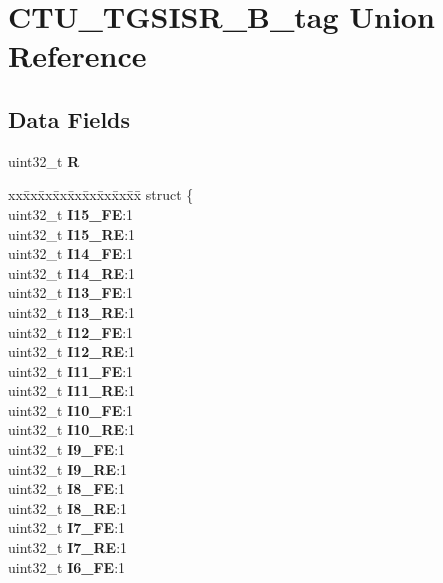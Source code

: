 \hypertarget{unionCTU__TGSISR__32B__tag}{}\section{C\+T\+U\+\_\+\+T\+G\+S\+I\+S\+R\+\_\+B\+\_\+tag Union Reference}
\label{unionCTU__TGSISR__32B__tag}
\subsection*{Data Fields}
\begin{DoxyCompactItemize}
\item 
\mbox{\label{unionCTU__TGSISR__32B__tag_a9bc098743401e6f947fafed55ed6cfbd}} 
uint32\+\_\+t {\bfseries R}
\item 
\mbox{\label{unionCTU__TGSISR__32B__tag_acf5c9135e5bcd9826928e83d151aae0c}} 
\begin{tabbing}
xx\=xx\=xx\=xx\=xx\=xx\=xx\=xx\=xx\=\kill
struct \{\\
\>uint32\_t {\bfseries I15\_FE}:1\\
\>uint32\_t {\bfseries I15\_RE}:1\\
\>uint32\_t {\bfseries I14\_FE}:1\\
\>uint32\_t {\bfseries I14\_RE}:1\\
\>uint32\_t {\bfseries I13\_FE}:1\\
\>uint32\_t {\bfseries I13\_RE}:1\\
\>uint32\_t {\bfseries I12\_FE}:1\\
\>uint32\_t {\bfseries I12\_RE}:1\\
\>uint32\_t {\bfseries I11\_FE}:1\\
\>uint32\_t {\bfseries I11\_RE}:1\\
\>uint32\_t {\bfseries I10\_FE}:1\\
\>uint32\_t {\bfseries I10\_RE}:1\\
\>uint32\_t {\bfseries I9\_FE}:1\\
\>uint32\_t {\bfseries I9\_RE}:1\\
\>uint32\_t {\bfseries I8\_FE}:1\\
\>uint32\_t {\bfseries I8\_RE}:1\\
\>uint32\_t {\bfseries I7\_FE}:1\\
\>uint32\_t {\bfseries I7\_RE}:1\\
\>uint32\_t {\bfseries I6\_FE}:1\\

\end{tabbing}
\end{DoxyCompactItemize}
